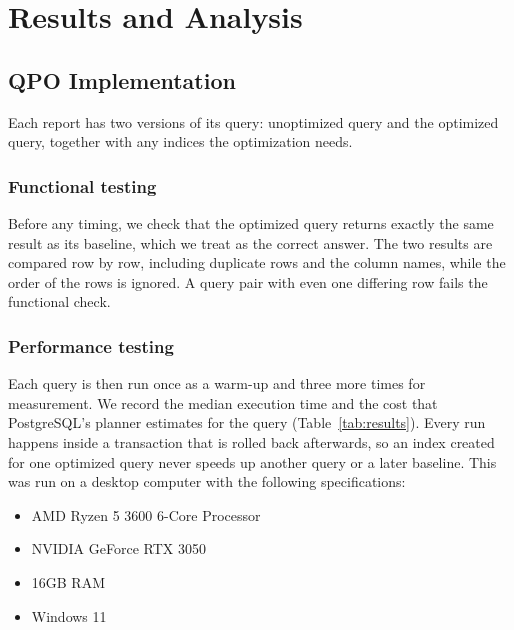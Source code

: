 \section{Results and Analysis}
\label{sec:results_and_analysis}

\subsection{QPO Implementation}
\label{subsec:qpo_implementation}

Each report has two versions of its query: unoptimized query and the optimized query, together with any indices the optimization needs.

\subsubsection{Functional testing}
Before any timing, we check that the optimized query returns exactly the same result as its baseline, which we treat as the correct answer. The two results are compared row by row, including duplicate rows and the column names, while the order of the rows is ignored. A query pair with even one differing row fails the functional check.

\subsubsection{Performance testing}
Each query is then run once as a warm-up and three more times for measurement. We record the median execution time and the cost that PostgreSQL's planner estimates for the query (Table~\ref{tab:results}). Every run happens inside a transaction that is rolled back afterwards, so an index created for one optimized query never speeds up another query or a later baseline.
This was run on a desktop computer with the following specifications:
\begin{itemize}
    \item AMD Ryzen 5 3600 6-Core Processor
    \item NVIDIA GeForce RTX 3050
    \item 16GB RAM
    \item Windows 11
\end{itemize}


